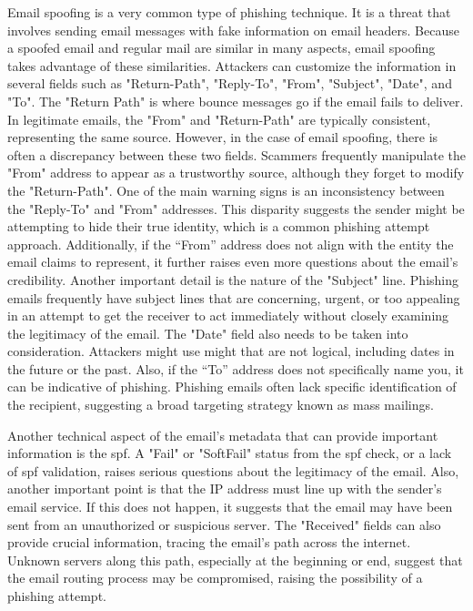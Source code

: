 Email spoofing is a very common type of phishing technique. It is a threat that involves sending email messages with fake information on email headers. Because a spoofed email and regular mail are similar in many aspects, email spoofing takes advantage of these similarities. Attackers can customize the information in several fields such as "Return-Path", "Reply-To", "From", "Subject", "Date", and "To".
The "Return Path" is where bounce messages go if the email fails to deliver. In legitimate emails, the "From" and "Return-Path" are typically consistent, representing the same source. However, in the case of email spoofing, there is often a discrepancy between these two fields. Scammers frequently manipulate the "From" address to appear as a trustworthy source, although they forget to modify the "Return-Path".
One of the main warning signs is an inconsistency between the "Reply-To" and "From" addresses. This disparity suggests the sender might be attempting to hide their true identity, which is a common phishing attempt approach. Additionally, if the “From” address does not align with the entity the email claims to represent, it further raises even more questions about the email's credibility. 
Another important detail is the nature of the "Subject" line. Phishing emails frequently have subject lines that are concerning, urgent, or too appealing in an attempt to get the receiver to act immediately without closely examining the legitimacy of the email. 
The "Date" field also needs to be taken into consideration. Attackers might use might that are not logical, including dates in the future or the past. Also, if the “To” address does not specifically name you, it can be indicative of phishing. Phishing emails often lack specific identification of the recipient, suggesting a broad targeting strategy known as mass mailings.

Another technical aspect of the email's metadata that can provide important information is the \ac{spf}. A "Fail" or "SoftFail" status from the \ac{spf} check, or a lack of \ac{spf} validation, raises serious questions about the legitimacy of the email. Also, another important point is that the IP address must line up with the sender's email service. If this does not happen, it suggests that the email may have been sent from an unauthorized or suspicious server. The "Received" fields can also provide crucial information, tracing the email's path across the internet. Unknown servers along this path, especially at the beginning or end, suggest that the email routing process may be compromised, raising the possibility of a phishing attempt.\\

